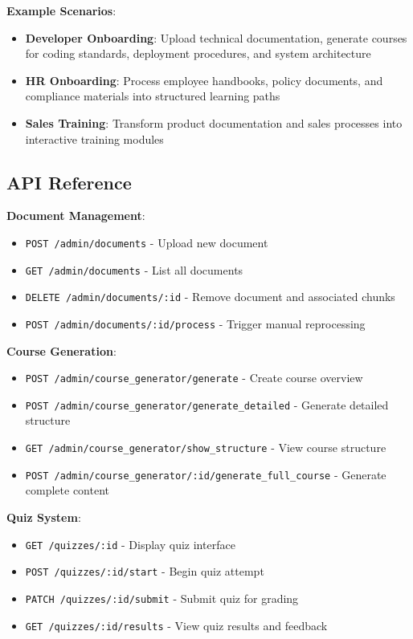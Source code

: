 \documentclass[a4paper,11pt]{article}
\begin{document}
\textbf{Example Scenarios}:
\begin{itemize}
    \item \textbf{Developer Onboarding}: Upload technical documentation, generate courses for coding standards, deployment procedures, and system architecture
    \item \textbf{HR Onboarding}: Process employee handbooks, policy documents, and compliance materials into structured learning paths
    \item \textbf{Sales Training}: Transform product documentation and sales processes into interactive training modules
\end{itemize}

\subsection{API Reference}

\textbf{Document Management}:
\begin{itemize}
    \item \texttt{POST /admin/documents} - Upload new document
    \item \texttt{GET /admin/documents} - List all documents
    \item \texttt{DELETE /admin/documents/:id} - Remove document and associated chunks
    \item \texttt{POST /admin/documents/:id/process} - Trigger manual reprocessing
\end{itemize}

\textbf{Course Generation}:
\begin{itemize}
    \item \texttt{POST /admin/course\_generator/generate} - Create course overview
    \item \texttt{POST /admin/course\_generator/generate\_detailed} - Generate detailed structure
    \item \texttt{GET /admin/course\_generator/show\_structure} - View course structure
    \item \texttt{POST /admin/course\_generator/:id/generate\_full\_course} - Generate complete content
\end{itemize}

\textbf{Quiz System}:
\begin{itemize}
    \item \texttt{GET /quizzes/:id} - Display quiz interface
    \item \texttt{POST /quizzes/:id/start} - Begin quiz attempt
    \item \texttt{PATCH /quizzes/:id/submit} - Submit quiz for grading
    \item \texttt{GET /quizzes/:id/results} - View quiz results and feedback
\end{itemize}
\end{document}
